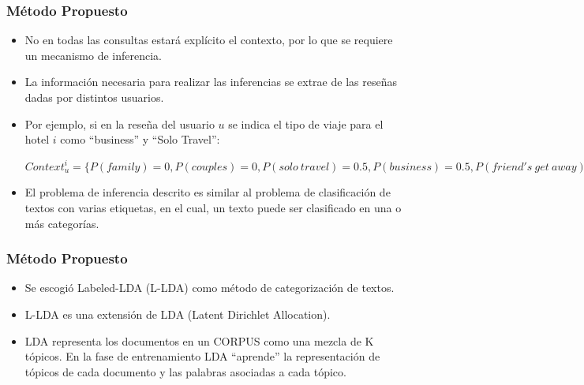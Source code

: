 \documentclass{beamer}
\begin{document}

\begin{frame}
\frametitle{Método Propuesto}
\begin{itemize}

\item No en todas las consultas estará explícito el contexto, por lo que se requiere un mecanismo de inferencia.

\item La información necesaria para realizar las inferencias se extrae de las reseñas dadas por distintos usuarios.

\item Por ejemplo, si en la reseña del usuario $u$ se indica el tipo de viaje para el hotel $i$ como ``business'' y ``Solo Travel'':

$Context_u^i = \{P(family) = 0, P(couples) = 0, P(solo \ travel) = 0.5, P(business) = 0.5, P(friend's \ get \ away) = 0\}$

\item El problema de inferencia descrito es similar al problema de clasificación de textos con varias etiquetas, en el cual, un texto puede ser clasificado en una o más categorías.

\end{itemize}
\end{frame}


\begin{frame}
\frametitle{Método Propuesto}
\begin{itemize}
\item Se escogió Labeled-LDA (L-LDA) como método de categorización de textos.
\item L-LDA es una extensión de LDA (Latent Dirichlet Allocation).
\item LDA representa los documentos en un CORPUS como una mezcla de K tópicos. En la fase de entrenamiento LDA ``aprende'' la representación de tópicos de cada documento y las palabras asociadas a cada tópico.
\end{itemize}

\end{frame}

\end{document}
